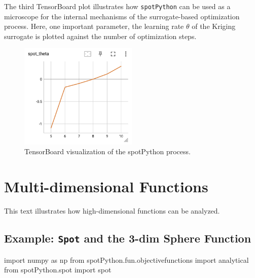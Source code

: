 \documentclass[
  letterpaper,
  DIV=11,
  numbers=noendperiod]{scrreprt}
\newenvironment{Shaded}{\begin{snugshade}}{\end{snugshade}}
\newcommand{\ImportTok}[1]{\textcolor[rgb]{0.00,0.46,0.62}{#1}}
\newcommand{\NormalTok}[1]{\textcolor[rgb]{0.00,0.23,0.31}{#1}}
\begin{document}
The third TensorBoard plot illustrates how \texttt{spotPython} can be
used as a microscope for the internal mechanisms of the surrogate-based
optimization process. Here, one important parameter, the learning rate
\(\theta\) of the Kriging surrogate is plotted against the number of
optimization steps.

\begin{figure}

{\centering \includegraphics[width=0.5\textwidth,height=\textheight]{figures_static/01_tensorboard_03.png}

}

\caption{TensorBoard visualization of the spotPython process.}

\end{figure}

\hypertarget{sec-multi-dim}{%
\chapter{Multi-dimensional Functions}\label{sec-multi-dim}}

This text illustrates how high-dimensional functions can be analyzed.

\hypertarget{example-spot-and-the-3-dim-sphere-function}{%
\section{\texorpdfstring{Example: \texttt{Spot} and the 3-dim Sphere
Function}{Example: Spot and the 3-dim Sphere Function}}\label{example-spot-and-the-3-dim-sphere-function}}

\begin{Shaded}
\begin{Highlighting}[]
\ImportTok{import}\NormalTok{ numpy }\ImportTok{as}\NormalTok{ np}
\ImportTok{from}\NormalTok{ spotPython.fun.objectivefunctions }\ImportTok{import}\NormalTok{ analytical}
\ImportTok{from}\NormalTok{ spotPython.spot }\ImportTok{import}\NormalTok{ spot}
\end{Highlighting}
\end{Shaded}
\end{document}
